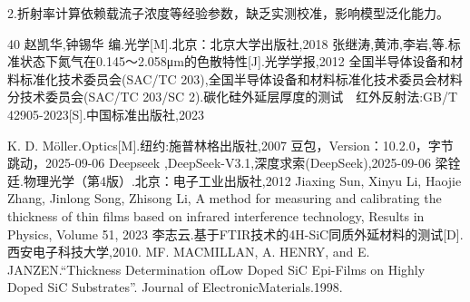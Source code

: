 \documentclass[UTF8]{ctexart}
\begin{document}
2.折射率计算依赖载流子浓度等经验参数，缺乏实测校准，影响模型泛化能力。\par
\begin{thebibliography}{40}
	赵凯华,钟锡华 编.光学[M].北京：北京大学出版社,2018
	张继涛,黄沛,李岩,等.标准状态下氮气在0.145～2.058μm的色散特性[J].光学学报,2012
	全国半导体设备和材料标准化技术委员会(SAC/TC 203),全国半导体设备和材料标准化技术委员会材料分技术委员会(SAC/TC 203/SC 2).碳化硅外延层厚度的测试　红外反射法:GB/T 42905-2023[S].中国标准出版社,2023
	
	K. D. Möller.Optics[M].纽约:施普林格出版社,2007
	豆包，Version：10.2.0，字节跳动，2025-09-06
	Deepseek ,DeepSeek-V3.1,深度求索(DeepSeek),2025-09-06
	梁铨廷.物理光学（第4版）.北京：电子工业出版社,2012
	Jiaxing Sun, Xinyu Li, Haojie Zhang, Jinlong Song, Zhisong Li,
	A method for measuring and calibrating the thickness of thin films based on infrared interference technology,
	Results in Physics,
	Volume 51,
	2023
	李志云.基于FTIR技术的4H-SiC同质外延材料的测试[D].西安电子科技大学,2010.
	MF. MACMILLAN, A. HENRY, and E. JANZEN.“Thickness Determination ofLow Doped SiC Epi-Films on Highly Doped SiC Substrates”. Journal of ElectronicMaterials.1998.
\end{thebibliography}
\newpage
{}	%
\end{document}
